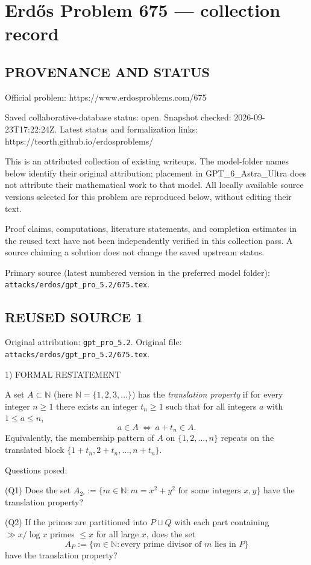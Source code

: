 \section*{Erd\H{o}s Problem 675 --- collection record}

\subsection*{PROVENANCE AND STATUS}
Official problem: https://www.erdosproblems.com/675

Saved collaborative-database status: open.
Snapshot checked: 2026-09-23T17:22:24Z.
Latest status and formalization links: https://teorth.github.io/erdosproblems/

This is an attributed collection of existing writeups. The model-folder names below identify their original attribution; placement in GPT\_6\_Astra\_Ultra does not attribute their mathematical work to that model. All locally available source versions selected for this problem are reproduced below, without editing their text.

Proof claims, computations, literature statements, and completion estimates in the reused text have not been independently verified in this collection pass. A source claiming a solution does not change the saved upstream status.

Primary source (latest numbered version in the preferred model folder): \texttt{attacks/erdos/gpt\_pro\_5.2/675.tex}.

\subsection*{REUSED SOURCE 1}
Original attribution: \texttt{gpt\_pro\_5.2}.
Original file: \texttt{attacks/erdos/gpt\_pro\_5.2/675.tex}.


1) FORMAL RESTATEMENT

A set $A\subset\mathbb N$ (here $\mathbb N=\{1,2,3,\dots\}$) has the \emph{translation property} if for every integer $n\ge 1$ there exists an integer $t_n\ge 1$ such that for all integers $a$ with $1\le a\le n$,
\[
 a\in A\ \Longleftrightarrow\ a+t_n\in A.
\]
Equivalently, the membership pattern of $A$ on $\{1,2,\dots,n\}$ repeats on the translated block $\{1+t_n,2+t_n,\dots,n+t_n\}$.

Questions posed:

(Q1) Does the set $A_{2\square}:=\{m\in\mathbb N: m=x^2+y^2\text{ for some integers }x,y\}$ have the translation property?

(Q2) If the primes are partitioned into $P\sqcup Q$ with each part containing $\gg x/\log x$ primes $\le x$ for all large $x$, does the set
\[
A_P:=\{m\in\mathbb N: \text{every prime divisor of }m\text{ lies in }P\}
\]
have the translation property?

